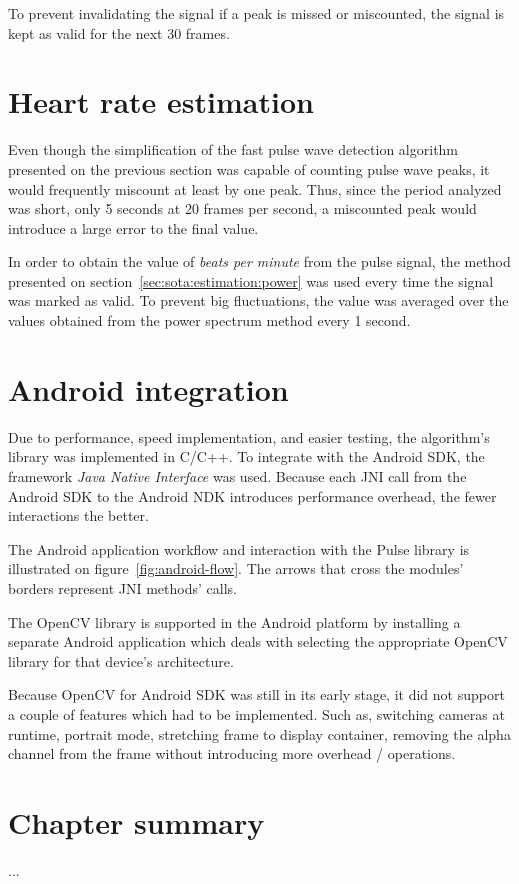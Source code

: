 To prevent invalidating the signal if a peak is missed or miscounted, 
the signal is kept as valid for the next 30 frames.

\section{Heart rate estimation} \label{sec:impl:estimation}

Even though the simplification of the fast pulse wave detection algorithm
presented on the previous section was capable of counting pulse wave peaks,
it would frequently miscount at least by one peak. Thus, since the period
analyzed was short, only 5 seconds at 20 frames per second, a miscounted peak
would introduce a large error to the final value.

In order to obtain the value of \emph{beats per minute} from the pulse signal, 
the method presented on section~\ref{sec:sota:estimation:power} was used
every time the signal was marked as valid.
To prevent big fluctuations, the value was averaged over the values obtained 
from the power spectrum method every 1 second.

\section{Android integration} \label{sec:impl:android}


Due to performance, speed implementation, and easier testing, the algorithm's
library was implemented in C/C++. To integrate with the Android SDK, the 
framework \emph{Java Native Interface} was used. Because each JNI call from the 
Android SDK to the Android NDK introduces performance overhead, 
the fewer interactions the better.

The Android application workflow and interaction with the Pulse library is 
illustrated on figure~\ref{fig:android-flow}. The arrows that cross the 
modules' borders represent JNI methods' calls.

The OpenCV library is supported in the Android platform by installing 
a separate Android application which deals with selecting the appropriate 
OpenCV library for that device's architecture.

Because OpenCV for Android SDK was still in its early stage, it did not support
a couple of features which had to be implemented. Such as, switching cameras at
runtime, portrait mode, stretching frame to display container, removing
the alpha channel from the frame without introducing more overhead / operations.

\section{Chapter summary}

...
